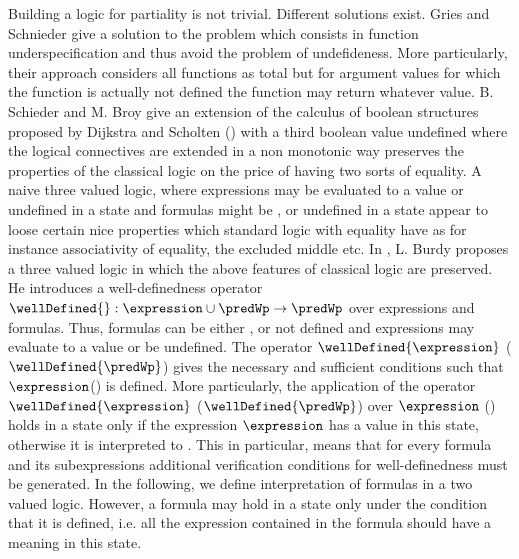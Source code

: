 Building a logic for partiality is not trivial. Different solutions exist. 
Gries and Schnieder \cite{gries95avoiding} give a solution to the problem which consists in function 
underspecification  and thus  avoid the problem of undefideness.
 More particularly, their approach considers all functions as total but for argument values for which the function is actually 
not defined the function may return whatever value.  B. Schieder and M. Broy \cite{schieder99adapting} give 
  an extension  of the calculus of boolean structures proposed by Dijkstra and Scholten (\cite{WPCDS}) with a  third boolean value 
undefined where  the logical connectives are extended in a non monotonic way preserves the properties of the classical logic
on the price  of having two sorts of equality.
A naive three valued logic, where expressions may be evaluated to a value or  undefined  in a state and
 formulas might be \false{}, \true{} or undefined in a state appear to loose certain nice properties
 which standard logic with equality have
as for instance associativity of equality, the excluded middle \cite{gries95avoiding} etc. 
In \cite{burdy98treatment}, L. Burdy proposes a three valued logic in which the above features of classical logic are preserved.
He introduces a well-definedness operator $\wellDefined{}: \expression \cup \predWp \rightarrow \predWp$
 over expressions and formulas. Thus, formulas can be either \true{}, \false{} or not defined and
expressions may evaluate to a value or be undefined. The operator  $\wellDefined{\expression}$ ($\wellDefined{\predWp}$) 
 gives the necessary and sufficient
 conditions such that $\expression$(\predWp ) is defined.
 More particularly, the application of the operator   $\wellDefined{\expression}$  ($\wellDefined{\predWp}$) over $\expression$  (\predWp ) 
 holds in a state only if the expression $\expression$ has  a value in this state, otherwise it is interpreted to \false{}.
 This in particular, means that for every formula and its subexpressions additional verification conditions for well-definedness must be generated.
 In the following, we define interpretation of formulas  in a two valued logic. However, a formula may hold in a state only under the condition that
 it is  defined, i.e. all the expression contained in the formula should have a meaning in  this state.
 

